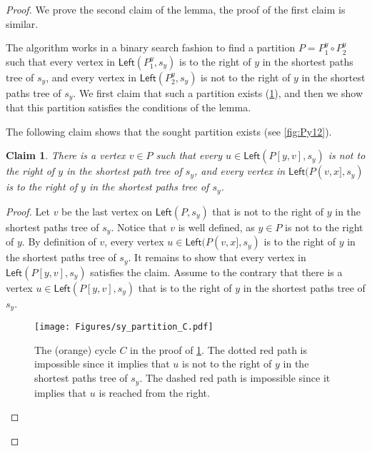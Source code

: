\documentclass{article}
\newcommand{\Left}{\mathsf{Left}}
\newtheorem{claim}{Claim}
\begin{document}
\begin{proof}
    We prove the second claim of the lemma, the proof of the first claim is similar.

    The algorithm works in a binary search fashion to find a partition $P=P^y_1 \circ P^y_2$ such that every vertex in $\Left(P^y_1,s_y)$ is to the right of $y$ in the shortest paths tree of $s_y$, and every vertex in $\Left(P^y_2,s_y)$ is not to the right of $y$ in the shortest paths tree of $s_y$.
    We first claim that such a partition exists (\cref{clm:xypartitionexsist}), and then we show that this partition satisfies the conditions of the lemma.

    The following claim shows that the sought partition exists (see \cref{fig:Py12}).
\begin{claim}\label{clm:xypartitionexsist}
    There is a vertex $v\in P$ such that every $u\in \Left(P[y,v],s_y)$ is not to the right of $y$ in the shortest path tree of $s_y$, and every vertex in $\Left(P(v,x],s_y)$ is to the right of $y$ in the shortest paths tree of $s_y$.
\end{claim}
\begin{proof}
    Let $v$ be the last vertex on $\Left(P,s_y)$ that is not to the right of $y$ in the shortest paths tree of $s_y$.
    Notice that $v$ is well defined, as $y\in P$ is not to the right of $y$.
    By definition of $v$, every vertex $u\in \Left(P(v,x],s_y)$ is to the right of $y$ in the shortest paths tree of $s_y$.
    It remains to show that every vertex in $\Left(P[y,v],s_y)$ satisfies the claim.
    Assume to the contrary that there is a vertex $u\in \Left(P[y,v],s_y)$ that is to the right of $y$ in the shortest paths tree of $s_y$.
\begin{figure}[ht]
    \centering
    \texttt{[image: Figures/sy\_partition\_C.pdf]}
    \caption{The (orange) cycle $C$ in the proof of \cref{clm:xypartitionexsist}. The dotted red path is impossible since it implies that $u$ is not to the right of $y$ in the shortest paths tree of $s_y$. The dashed red path is impossible since it implies that $u$ is reached from the right.}
   \label{fig:xypartitionexsist}
\end{figure}


\end{proof}
\end{proof}
\end{document}
